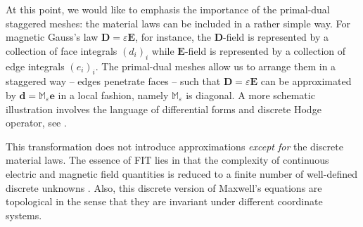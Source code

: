 \documentclass{article}
\begin{document}
At this point, we would like to emphasis the importance of the primal-dual staggered meshes: the material laws can be included in a rather simple way. For magnetic Gauss's law $\mathbf{D} = \varepsilon \mathbf{E}$, for instance, the $\mathbf{D}$-field is represented by a collection of face integrals $ (d_i)_{i}$ while $\mathbf{E}$-field is represented by a collection of edge integrals $ (e_i)_{i}$. The primal-dual meshes allow us to arrange them in a staggered way -- edges penetrate faces -- such that $\mathbf{D} = \varepsilon \mathbf{E}$ can be approximated by $\mathbf{d} = \mathbb{M}_{\varepsilon}\mathbf{e}$ in a local fashion, namely $\mathbb{M}_{\varepsilon}$ is diagonal. A more schematic illustration involves the language of differential forms and discrete Hodge operator, see \cite{bossavit1999, teixeira_1999, hip_1999}. 

This transformation does not introduce approximations \emph{except for} the discrete material laws. The essence of FIT lies in that the complexity of continuous electric and magnetic field quantities
is reduced to a finite number of well-defined discrete unknowns \citep{weiland_2003}. Also, this discrete version of Maxwell's equations are topological in the sense that they are invariant under different coordinate systems.
\end{document}
